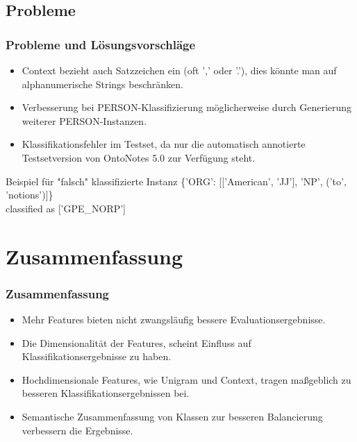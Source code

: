 \documentclass{beamer}
\begin{document}
		\subsection{Probleme}
		\begin{frame}
			\frametitle{Probleme und Lösungsvorschläge}
			\begin{itemize}
				\item Context bezieht auch Satzzeichen ein (oft ',' oder '.'), dies könnte man auf alphanumerische Strings beschränken.\\
				
				\item Verbesserung bei PERSON-Klassifizierung möglicherweise durch Generierung weiterer PERSON-Instanzen.
				
				\item Klassifikationsfehler im Testset, da nur die automatisch annotierte Testsetversion von OntoNotes 5.0 zur Verfügung steht.\\
			\end{itemize}
			
			
			\begin{exampleblock}{Beispiel für "falsch" klassifizierte Instanz}
				\{'ORG': [['American', 'JJ'], 'NP', ('to', 'notions')]\}\\classified as ['GPE\_NORP']
			\end{exampleblock}
			
			
		\end{frame}
\section{Zusammenfassung}
	\begin{frame}
		\frametitle{Zusammenfassung}
		\begin{itemize}
			\item Mehr Features bieten nicht zwangsläufig bessere Evaluationsergebnisse.
			\item Die Dimensionalität der Features, scheint Einfluss auf Klassifikationsergebnisse zu haben.
			\item Hochdimensionale Features, wie Unigram und Context, tragen maßgeblich zu besseren Klassifikationsergebnissen bei.
			\item Semantische Zusammenfassung von Klassen zur besseren Balancierung verbessern die Ergebnisse.
		\end{itemize}
	\end{frame}
\end{document}
